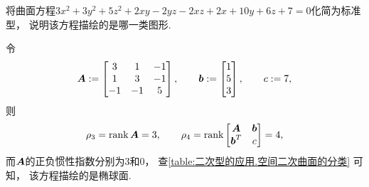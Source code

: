 \begin{example}
将曲面方程\(3x^2+3y^2+5z^2+2xy-2yz-2xz+2x+10y+6z+7=0\)化简为标准型，
说明该方程描绘的是哪一类图形.
\begin{solution}
令\begin{equation*}
	\boldsymbol{A} := \begin{bmatrix}
		3 & 1 & -1 \\
		1 & 3 & -1 \\
		-1 & -1 & 5
	\end{bmatrix},
	\qquad
	\boldsymbol{b} := \begin{bmatrix}
		1 \\ 5 \\ 3
	\end{bmatrix},
	\qquad
	c := 7,
\end{equation*}
则\begin{equation*}
	\rho_3
	= \rank\boldsymbol{A}
	= 3,
	\qquad
	\rho_4
	= \rank\begin{bmatrix}
		\boldsymbol{A} & \boldsymbol{b} \\
		\boldsymbol{b}^T & c
	\end{bmatrix}
	= 4,
\end{equation*}
而\(\boldsymbol{A}\)的正负惯性指数分别为\(3\)和\(0\)，
查\cref{table:二次型的应用.空间二次曲面的分类} 可知，
该方程描绘的是椭球面.
\end{solution}
\end{example}
